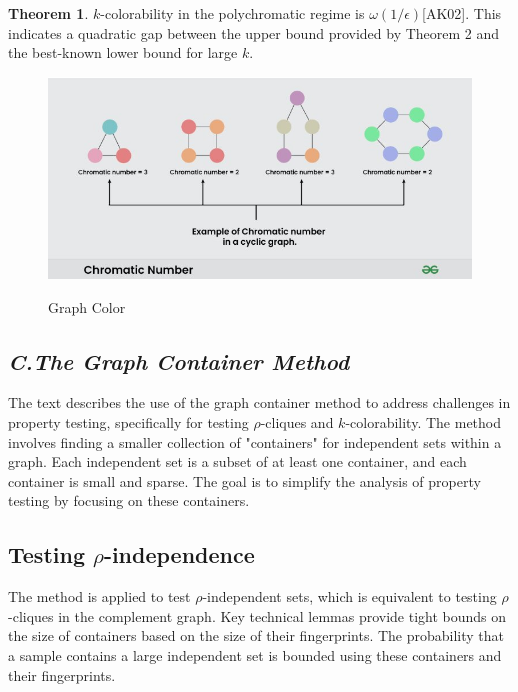 \documentclass[preprint,11pt]{elsarticle}
\theoremstyle{definition}
\newtheorem{theorem}{Theorem}
\begin{document}
\begin{multicols}{2}
\begin{theorem}
$k$-colorability in the polychromatic regime is  $\omega(1/\epsilon) $[AK02]. This indicates a quadratic gap between the upper bound provided by Theorem 2 and the best-known lower bound for large $k$.
\end{theorem}
\begin{figure}[H]
    \centering
    \includegraphics[width=\columnwidth]{images/graphColor.jpg} 
    \caption{Graph Color}\cite{GFG2024b}
    \label{fig:Fig 2}
\end{figure}
\subsection*{\textit{\textbf{C.The Graph Container Method}}}
The text describes the use of the graph container method to address challenges in property testing, specifically for testing $\rho$-cliques and $k$-colorability. The method involves finding a smaller collection of "containers" for independent sets within a graph. Each independent set is a subset of at least one container, and each container is small and sparse. The goal is to simplify the analysis of property testing by focusing on these containers.
\subsection*{Testing $\rho$-independence}
The method is applied to test $\rho$-independent sets, which is equivalent to testing $\rho$-cliques in the complement graph.
Key technical lemmas provide tight bounds on the size of containers based on the size of their fingerprints.
The probability that a sample contains a large independent set is bounded using these containers and their fingerprints.

\end{multicols}
\end{document}

